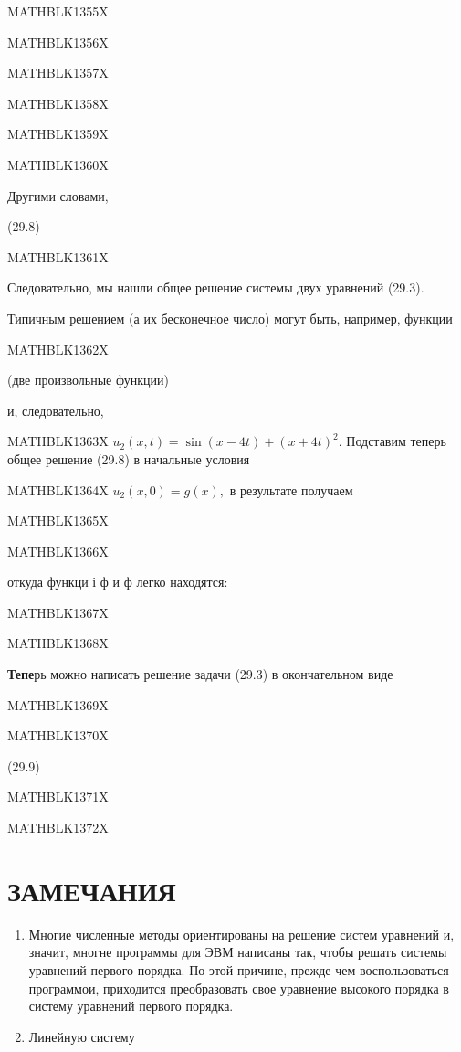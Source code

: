 \documentclass[
]{article}
\begin{document}
MATHBLK1355X

MATHBLK1356X

MATHBLK1357X

MATHBLK1358X

MATHBLK1359X

MATHBLK1360X

Другими словами,

(29.8)

MATHBLK1361X

Следовательно, мы нашли общее решение системы двух уравнений (29.3).

Типичным решением (а их бесконечное число) могут быть, например, функции

MATHBLK1362X

(две произвольные функции)

и, следовательно,

MATHBLK1363X \(u_2(x, t) = \sin(x-4t) + (x+4t)^2.\) Подставим теперь
общее решение (29.8) в начальные условия

MATHBLK1364X \(u_2(x, 0) = g(x),\) в результате получаем

MATHBLK1365X

MATHBLK1366X

откуда функци і ф и ф легко находятся:

MATHBLK1367X

MATHBLK1368X

\textbf{Тепе}рь можно написать решение задачи (29.3) в окончательном
виде

MATHBLK1369X

MATHBLK1370X

(29.9)

MATHBLK1371X

MATHBLK1372X

\section{ЗАМЕЧАНИЯ}\label{ux437ux430ux43cux435ux447ux430ux43dux438ux44f-2}

\begin{enumerate}
\def\labelenumi{\arabic{enumi}.}
\item
  Многие численные методы ориентированы на решение систем уравнений и,
  значит, многне программы для ЭВМ написаны так, чтобы решать системы
  уравнений первого порядка. По этой причине, прежде чем воспользоваться
  программои, приходится преобразовать свое уравнение высокого порядка в
  систему уравнений первого порядка.
\item
  Линейную систему
\end{enumerate}
\end{document}
